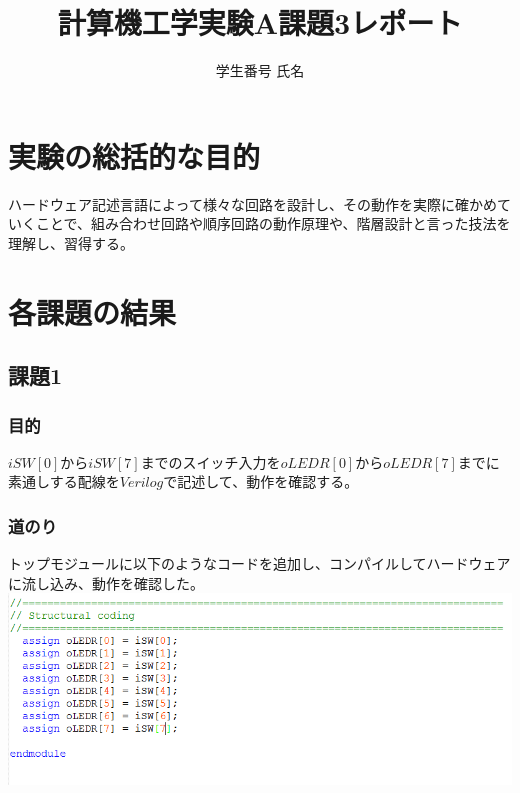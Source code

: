 \documentclass[a4paper]{jarticle}
\title{計算機工学実験A課題3レポート}
\author{学生番号 氏名}
\begin{document}
\maketitle
\section{実験の総括的な目的}
ハードウェア記述言語によって様々な回路を設計し、その動作を実際に確かめていくことで、組み合わせ回路や順序回路の動作原理や、階層設計と言った技法を理解し、習得する。
\section{各課題の結果}
\subsection{課題1}
\subsubsection{目的}
$iSW[0]$から$iSW[7]$までのスイッチ入力を$oLEDR[0]$から$oLEDR[7]$までに素通しする配線を$Verilog$で記述して、動作を確認する。
\subsubsection{道のり}
トップモジュールに以下のようなコードを追加し、コンパイルしてハードウェアに流し込み、動作を確認した。
\includegraphics[width=15cm]{work1/1.PNG}
\end{document}
